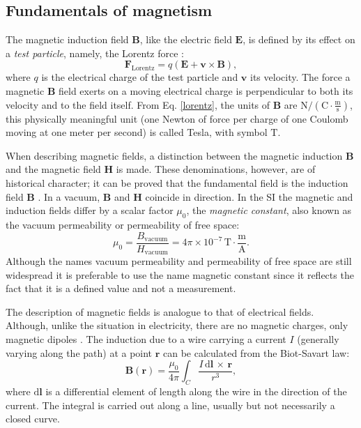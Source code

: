 \subsection{Fundamentals of magnetism}
The magnetic induction field $\boldsymbol{B}$, like the electric field $\boldsymbol{E}$, is defined by its effect on a \textit{test particle}, namely, the Lorentz force \citep{Feynman}:
\begin{equation}\label{lorentz}
\boldsymbol{F}_\text{Lorentz} = q(\boldsymbol{E} + \boldsymbol{v}\times\boldsymbol{B}),
\end{equation}
where $q$ is the electrical charge of the test particle and $\boldsymbol{v}$ its velocity. The force a magnetic $\boldsymbol{B}$ field exerts on a moving electrical charge is perpendicular to both its velocity and to the field itself. From Eq. \ref{lorentz}, the units of $\boldsymbol{B}$ are $\text{N}/(\text{C}\cdot\frac{\text{m}}{\text{s}})$, this physically meaningful unit (one Newton of force per charge of one Coulomb moving at one meter per second) is called Tesla, with symbol $\text{T}$.\par

When describing magnetic fields, a distinction between the magnetic induction $\boldsymbol{B}$ and the magnetic field $\boldsymbol{H}$ is made. These denominations, however, are of historical character; it can be proved that the fundamental field is the induction field $\boldsymbol{B}$ \citep{Feynman}. In a vacuum, $\boldsymbol{B}$ and $\boldsymbol{H}$ coincide in direction. In the SI the magnetic and induction fields differ by a scalar factor $\mu_0$, the \textit{magnetic constant}, also known as the vacuum permeability or permeability of free space:
\begin{equation}
\mu_0 = \frac{B_{\text{vacuum}}}{H_{\text{vacuum}}} = 4 \pi \times 10^{-7} \, \text{T}\cdot\frac{\text{m}}{\text{A}}.
\end{equation}
Although the names vacuum permeability and permeability of free space are still widespread it is preferable to use the name magnetic constant since it reflects the fact that it is a defined value and not a measurement.\par

The description of magnetic fields is analogue to that of electrical fields. Although, unlike the situation in electricity, there are no magnetic charges, only magnetic dipoles \citep{Feynman}. The induction due to a wire carrying a current $I$ (generally varying along the path) at a point $\boldsymbol{r}$ can be calculated from the Biot-Savart law:
\begin{equation}
\boldsymbol{B}(\boldsymbol{r}) = \frac{\mu_0}{4\pi} \int_C \frac{I\, \text{d}\boldsymbol{l}\, \times \, \boldsymbol{r}}{r^3},
\end{equation}
where $\text{d}\boldsymbol{l}$ is a differential element of length along the wire in the direction of the current. The integral is carried out along a line, usually but not necessarily a closed curve.\par

